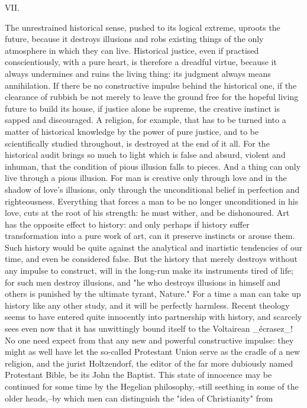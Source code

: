 VII.

The unrestrained historical sense, pushed to its logical extreme,
uproots the future, because it destroys illusions and robs existing
things of the only atmosphere in which they can live. Historical
justice, even if practised conscientiously, with a pure heart, is
therefore a dreadful virtue, because it always undermines and ruins
the living thing: its judgment always means annihilation. If there be
no constructive impulse behind the historical one, if the clearance
of rubbish be not merely to leave the ground free for the hopeful
living future to build its house, if justice alone be supreme, the
creative instinct is sapped and discouraged. A religion, for example,
that has to be turned into a matter of historical knowledge by the
power of pure justice, and to be scientifically studied throughout,
is destroyed at the end of it all. For the historical audit brings so
much to light which is false and absurd, violent and inhuman, that
the condition of pious illusion falls to pieces. And a thing can only
live through a pious illusion. For man is creative only through love
and in the shadow of love's illusions, only through the unconditional
belief in perfection and righteousness. Everything that forces a man
to be no longer unconditioned in his love, cuts at the root of his
strength: he must wither, and be dishonoured. Art has the opposite
effect to history: and only perhaps if history suffer transformation
into a pure work of art, can it preserve instincts or arouse them.
Such history would be quite against the analytical and inartistic
tendencies of our time, and even be considered false. But the history
that merely destroys without any impulse to construct, will in the
long-run make its instruments tired of life; for such men destroy
illusions, and "he who destroys illusions in himself and others is
punished by the ultimate tyrant, Nature." For a time a man can take
up history like any other study, and it will be perfectly harmless.
Recent theology seems to have entered quite innocently into
partnership with history, and scarcely sees even now that it has
unwittingly bound itself to the Voltairean _écrasez_! No one need
expect from that any new and powerful constructive impulse: they
might as well have let the so-called Protestant Union serve as the
cradle of a new religion, and the jurist Holtzendorf, the editor of
the far more dubiously named Protestant Bible, be its John the
Baptist. This state of innocence may be continued for some time by
the Hegelian philosophy,--still seething in some of the older
heads,--by which men can distinguish the "idea of Christianity" from
